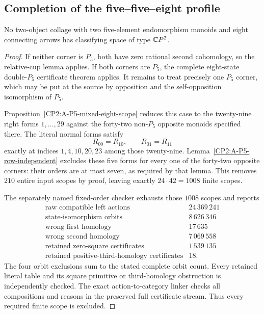 \subsection{Completion of the five--five--eight profile}

\begin{theorem}
\label{CP2:A-five-five-eight-complete}
No two-object collage with two five-element endomorphism
monoids and eight connecting arrows has classifying space
of type $\mathbb{C}P^2$.
\end{theorem}
\begin{proof}
If neither corner is $P_5$, both have zero rational second
cohomology, so the relative-cup lemma applies.  If both
corners are $P_5$, the complete eight-state double-$P_5$
certificate theorem applies.  It remains to treat precisely
one $P_5$ corner, which may be put at the source by
opposition and the self-opposition isomorphism of $P_5$.

Proposition~\ref{CP2:A-P5-mixed-eight-scope} reduces this
case to the twenty-nine right forms $1,\ldots,29$ against
the forty-two non-$P_5$ opposite monoids specified there.
The literal normal forms satisfy
\[
 R_{00}=R_{10},\qquad R_{01}=R_{11}
\]
exactly at indices $1,4,10,20,23$ among those twenty-nine.
Lemma~\ref{CP2:A-P5-row-independent} excludes these five
forms for every one of the forty-two opposite corners:
their orders are at most seven, as required by that lemma.
This removes $210$ entire input scopes by proof, leaving
exactly $24\cdot42=1008$ finite scopes.

The separately named fixed-order checker exhausts those
$1008$ scopes and reports
\[
\begin{array}{c|r}
\text{raw compatible left actions}&24\,369\,241\\
\text{state-isomorphism orbits}&8\,626\,346\\
\text{wrong first homology}&17\,635\\
\text{wrong second homology}&7\,069\,558\\
\text{retained zero-square certificates}&1\,539\,135\\
\text{retained positive-third-homology certificates}&18.
\end{array}
\]
The four orbit exclusions sum to the stated complete orbit
count.  Every retained literal table and its square primitive
or third-homology obstruction is independently checked.
The exact action-to-category linker checks all compositions
and reasons in the preserved full certificate stream.
Thus every required finite scope is excluded.


\end{proof}
